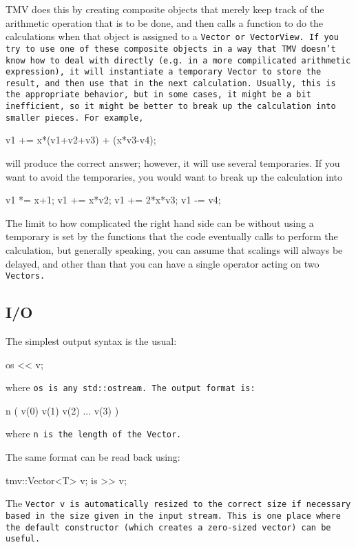 TMV does this by creating composite objects that merely keep track of the
arithmetic operation that is to be done, and then calls a function to do
the calculations when that object is assigned to a \tt{Vector} or
\tt{VectorView}.
If you try to use one of these composite objects in a way that TMV
doesn't know how to deal with directly (e.g. in a more compilicated 
arithmetic expression), it will instantiate a temporary
\tt{Vector} to store the result, and then use that in the next calculation.
Usually, this is the appropriate behavior, but in some cases, it might
be a bit inefficient, so it might be better to break up the calculation 
into smaller pieces.  For example,
\begin{tmvcode}
v1 += x*(v1+v2+v3) + (x*v3-v4);
\end{tmvcode}
will produce the correct answer; however, it will use several temporaries.
If you want to avoid the temporaries, you would want to break up the
calculation into
\begin{tmvcode}
v1 *= x+1;
v1 += x*v2;
v1 += 2*x*v3;
v1 -= v4;
\end{tmvcode}

The limit to how complicated the right hand side can be without using a 
temporary is set by the 
functions that the code eventually calls to perform the calculation, 
but generally speaking, you can assume that scalings will always be
delayed, and other than that you can have a single operator acting on 
two \tt{Vector}s.

\subsection{I/O}
\label{Vector_IO}

The simplest output syntax is the usual:
\begin{tmvcode}
os << v;
\end{tmvcode}
where \tt{os} is any \tt{std::ostream}.
The output format is:
\begin{tmvcode}
n ( v(0)  v(1)  v(2)  ...  v(3) )
\end{tmvcode}
where \tt{n} is the length of the \tt{Vector}.

The same format can be read back using:
\begin{tmvcode}
tmv::Vector<T> v;
is >> v;
\end{tmvcode}
The \tt{Vector v} is automatically resized to the correct size if necessary based in the size given in the input stream.  This is one place where the default constructor (which creates a zero-sized vector) can be useful.

